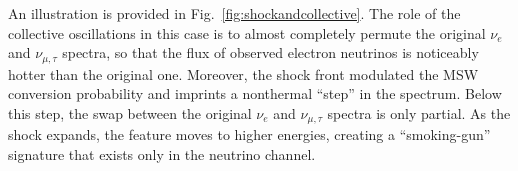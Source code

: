 An illustration is provided in Fig.~\ref{fig:shockandcollective}. The role of the collective oscillations in this case is to almost completely permute the original $\nu_{e}$ and $\nu_{\mu,\tau}$ spectra, so that the flux of observed electron neutrinos is noticeably hotter than the original one. Moreover, the shock front modulated the MSW conversion probability and imprints a nonthermal ``step'' in the spectrum. Below this step, the swap between the original $\nu_{e}$ and $\nu_{\mu,\tau}$ spectra is only partial. As the shock expands, the feature moves to higher energies, creating a ``smoking-gun'' signature that exists only in the neutrino channel. 










